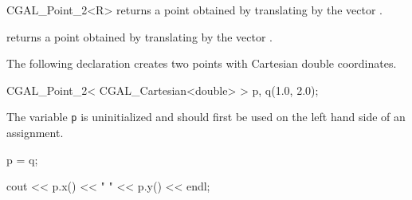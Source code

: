 \begin{ccClassTemplate} {CGAL_Point_2<R>}
       {returns a point obtained by translating  by the 
        vector .}

       {returns a point obtained by translating  by the 
        vector .}

\ccExample

The following declaration creates two points with Cartesian double coordinates.

\begin{cprog}

  CGAL_Point_2< CGAL_Cartesian<double> > p, q(1.0, 2.0);
\end{cprog} 

The variable {\tt p} is uninitialized and should first be used on 
the left hand side of an assignment. 
\begin{cprog}

  p = q;

  cout << p.x() << "  " << p.y() << endl; 
\end{cprog} 
\end{ccClassTemplate} 

%
%
%
%
